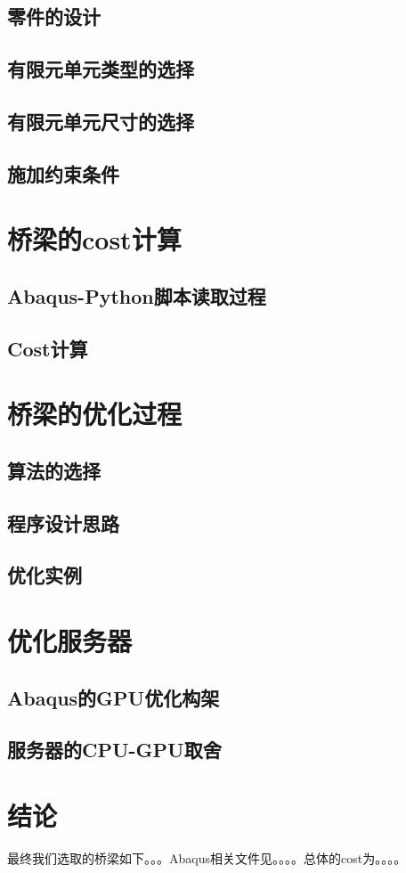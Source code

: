 \documentclass[forprint]{WHUBachelor}
\begin{document}
\section{零件的设计}
\section{有限元单元类型的选择}
\section{有限元单元尺寸的选择}
\section{施加约束条件}
\chapter{桥梁的cost计算}
\section{Abaqus-Python脚本读取过程}
\section{Cost计算}
\chapter{桥梁的优化过程}
\section{算法的选择}
\section{程序设计思路}
\section{优化实例}
\chapter{优化服务器}
\section{Abaqus的GPU优化构架}
\section{服务器的CPU-GPU取舍}
\chapter{结论}
最终我们选取的桥梁如下。。。Abaqus相关文件见。。。。总体的cost为。。。。


\cleardoublepage
\end{document}
